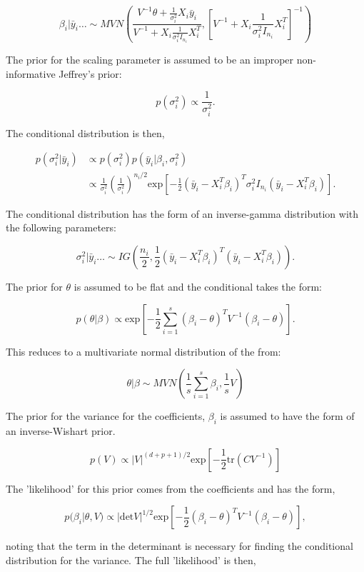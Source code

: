 \documentclass[11pt]{article}
\begin{document}
    $$\beta_i | \bar{y}_i \dots \sim MVN\left(\frac{V^{-1} \theta + \frac{1}{\sigma_i^2 }X_i \bar{y}_i }{V^{-1} + X_i \frac{1}{\sigma_i^2 I_{n_i}} X_i^T}, \left[V^{-1} + X_i \frac{1}{\sigma_i^2 I_{n_i}} X_i^T \right]^{-1} \right)$$

    The prior for the scaling parameter is assumed to be an improper non-informative Jeffrey's prior:

    $$p(\sigma_i^2) \propto \frac{1}{\sigma_i^2}.$$

    \noindent The conditional distribution is then,

    \begin{align*}
    p(\sigma_i^2| \bar{y}_i) &\propto p(\sigma_i^2) p(\bar{y}_i | \beta_i, \sigma_i^2) \\
    & \propto \frac{1}{\sigma_i^2} \left(\frac{1}{\sigma_i^2}\right)^{n_i/2} \text{exp}\left[ -\frac{1}{2} (\bar{y}_i - X_i^T \beta_i)^T \sigma_i^2 I_{n_i} (\bar{y}_i - X_i^T \beta_i)\right].
    \end{align*}

    \noindent The conditional distribution has the form of an inverse-gamma distribution with the following parameters:

    $$\sigma_i^2 | \bar{y}_i \dots \sim IG\left(\frac{n_i}{2},  \frac{1}{2} (\bar{y}_i - X_i^T \beta_i)^T (\bar{y}_i - X_i^T \beta_i)\right).$$

    The prior for $\theta$ is assumed to be flat and the conditional takes the form:

    $$p(\theta | \beta) \propto \text{exp} \left[-\frac{1}{2} \sum_{i=1}^s (\beta_i - \theta)^T V^{-1} (\beta_i - \theta) \right].$$

    This reduces to a multivariate normal distribution of the from:

    $$\theta | \beta \sim MVN \left(\frac{1}{s} \sum_{i=1}^s \beta_i, \frac{1}{s}V \right)$$

    The prior for the variance for the coefficients, $\beta_i$ is assumed to have the form of an inverse-Wishart prior.

    $$p(V) \propto |V|^{(d+p+1)/2} \text{exp}\left[-\frac{1}{2} \text{tr}(C V^{-1}) \right]$$

    The 'likelihood' for this prior comes from the coefficients and has the form,

    $$p(\beta_i | \theta, V) \propto | \text{det} V |^{1/2} \text{exp}\left[-\frac{1}{2} (\beta_i - \theta)^T V^{-1} (\beta_i - \theta) \right],$$

    \noindent noting that the term in the determinant is necessary for finding the conditional distribution for the variance. The full 'likelihood' is then,
\end{document}
